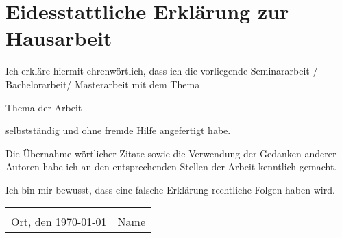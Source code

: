 \section{Eidesstattliche Erklärung zur Hausarbeit}

Ich erkläre hiermit ehrenwörtlich, dass ich die vorliegende Seminararbeit / Bachelorarbeit/  Masterarbeit mit dem Thema
\vspace{1cm}

\begin{center}
Thema der Arbeit
\end{center}
\vspace{1cm}

\noindent selbstständig und ohne fremde Hilfe angefertigt habe.

\vspace{1cm}
\noindent Die Übernahme wörtlicher Zitate sowie die Verwendung der Gedanken anderer Autoren habe ich an den entsprechenden Stellen der Arbeit kenntlich gemacht.

\vspace{1cm}
\noindent Ich bin mir bewusst, dass eine falsche Erklärung rechtliche Folgen haben wird.

\vspace{3cm}


\begin{tabulary}{\textwidth}{Lp{2in}@{}}
& \hrulefill \\
Ort, den \today& Name \\
\end{tabulary}